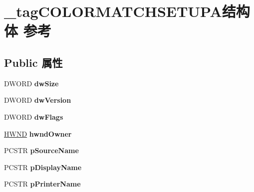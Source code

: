 \hypertarget{struct__tag_c_o_l_o_r_m_a_t_c_h_s_e_t_u_p_a}{}\section{\+\_\+tag\+C\+O\+L\+O\+R\+M\+A\+T\+C\+H\+S\+E\+T\+U\+P\+A结构体 参考}
\label{struct__tag_c_o_l_o_r_m_a_t_c_h_s_e_t_u_p_a}
\subsection*{Public 属性}
\begin{DoxyCompactItemize}
\item 
\mbox{\label{struct__tag_c_o_l_o_r_m_a_t_c_h_s_e_t_u_p_a_ae53033a3843a5bb7026258e4703331c5}} 
D\+W\+O\+RD {\bfseries dw\+Size}
\item 
\mbox{\label{struct__tag_c_o_l_o_r_m_a_t_c_h_s_e_t_u_p_a_a2146f75bef48255b0f7e15d567ab8bd7}} 
D\+W\+O\+RD {\bfseries dw\+Version}
\item 
\mbox{\label{struct__tag_c_o_l_o_r_m_a_t_c_h_s_e_t_u_p_a_a9d2a7b9f09b583ea8b8273f7d7f910a4}} 
D\+W\+O\+RD {\bfseries dw\+Flags}
\item 
\mbox{\label{struct__tag_c_o_l_o_r_m_a_t_c_h_s_e_t_u_p_a_aa784832ea7283efd73b5c7d8a97394fc}} 
\hyperlink{interfacevoid}{H\+W\+ND} {\bfseries hwnd\+Owner}
\item 
\mbox{\label{struct__tag_c_o_l_o_r_m_a_t_c_h_s_e_t_u_p_a_a8a050eec9a85603d8db63242c3fcc68a}} 
P\+C\+S\+TR {\bfseries p\+Source\+Name}
\item 
\mbox{\label{struct__tag_c_o_l_o_r_m_a_t_c_h_s_e_t_u_p_a_aa96a8e79ac4ea346d05503b14619b580}} 
P\+C\+S\+TR {\bfseries p\+Display\+Name}
\item 
\mbox{\label{struct__tag_c_o_l_o_r_m_a_t_c_h_s_e_t_u_p_a_ab276f5e7b018ca8b466c2c393662a113}} 
P\+C\+S\+TR {\bfseries p\+Printer\+Name}

\end{DoxyCompactItemize}
